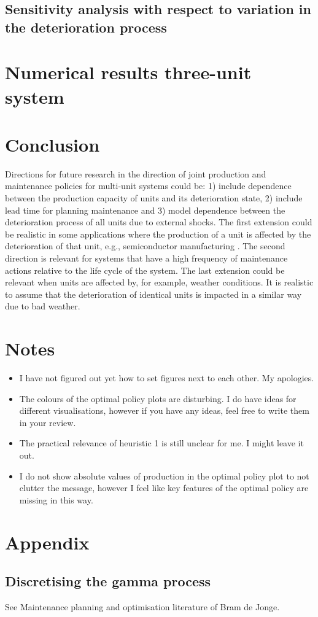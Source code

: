 \documentclass[a4paper,12pt]{article}
\begin{document}
\subsection{Sensitivity analysis with respect to variation in the deterioration process}

\section{Numerical results three-unit system}

\section{Conclusion}

Directions for future research in the direction of joint production and maintenance policies for multi-unit systems could be: 1) include dependence between the production capacity of units and its deterioration state, 2) include lead time for planning maintenance and 3) model dependence between the deterioration process of all units due to external shocks. The first extension could be realistic in some applications where the production of a unit is affected by the deterioration of that unit, e.g., semiconductor manufacturing \citep{kazaz2013impact}. The second direction is relevant for systems that have a high frequency of maintenance actions relative to the life cycle of the system. The last extension could be relevant when units are affected by, for example, weather conditions. It is realistic to assume that the deterioration of identical units is impacted in a similar way due to bad weather. 

\section{Notes}
\begin{itemize}
	\item I have not figured out yet how to set figures next to each other. My apologies. 
	\item The colours of the optimal policy plots are disturbing. I do have ideas for different visualisations, however if you have any ideas, feel free to write them in your review.
	\item The practical relevance of heuristic 1 is still unclear for me. I might leave it out.
	\item I do not show absolute values of production in the optimal policy plot to not clutter the message, however I feel like key features of the optimal policy are missing in this way.
\end{itemize}


 


\appendix

\section{Appendix}

\subsection{Discretising the gamma process}
See Maintenance planning and optimisation literature of Bram de Jonge.
\end{document}
